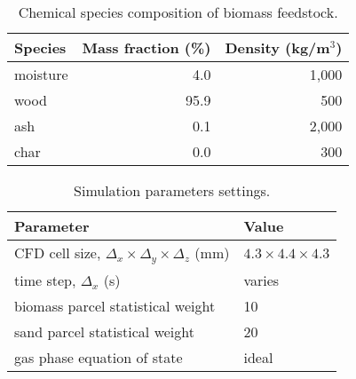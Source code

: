 \begin{table}[H]
    \centering
    \caption{Chemical species composition of biomass feedstock.}
    \begin{tabular}{lrr}
        \toprule
        Species & Mass fraction (\%) & Density (kg/m$^3$) \\
        \midrule
        moisture & 4.0  & 1,000 \\
        wood     & 95.9 & 500 \\
        ash      & 0.1  & 2,000 \\
        char     & 0.0  & 300 \\
        \bottomrule
    \end{tabular}
\end{table}

\begin{table}[H]
    \centering
    \caption{Simulation parameters settings.}
    \begin{tabular}{ll}
        \toprule
        Parameter & Value \\
        \midrule
        CFD cell size, $\Delta_x \times \Delta_y \times \Delta_z$ (mm) & $4.3 \times 4.4 \times 4.3$ \\
        time step, $\Delta_x$ (s) & varies \\
        biomass parcel statistical weight & 10 \\
        sand parcel statistical weight & 20 \\
        gas phase equation of state & ideal \\
        \bottomrule
    \end{tabular}
\end{table}
